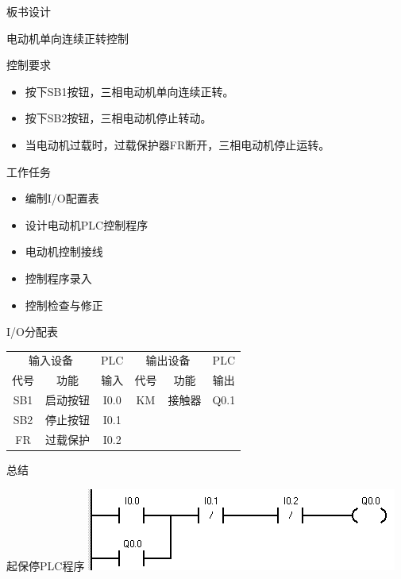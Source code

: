 {\begin{landscape}
\end{landscape}
\clearpage

\begin{center}
{\huge 板书设计}
\end{center}
}

\begin{frame}[containsverbatim]{电动机单向连续正转控制}
\begin{block}{控制要求}
\begin{itemize}
\item 按下SB1按钮，三相电动机单向连续正转。
\item 按下SB2按钮，三相电动机停止转动。
\item 当电动机过载时，过载保护器FR断开，三相电动机停止运转。
\end{itemize}
\end{block}
\end{frame}
\begin{frame}{}
\begin{block}{工作任务}
\begin{itemize}
\item 编制I/O配置表
\item 设计电动机PLC控制程序
\item 电动机控制接线
\item 控制程序录入
\item 控制检查与修正
\end{itemize}
\end{block}
\end{frame}
\begin{frame}
\begin{block}{I/O分配表}
\begin{small}
\begin{tabular}{|c|c|c|c|c|c|}
\hline 
\multicolumn{2}{|c|}{输入设备} & PLC &\multicolumn{2}{|c|}{输出设备} & PLC \\ 
\cline{1-2}\cline{4-5}
代号 & 功能 & 输入 & 代号 & 功能 & 输出 \\ 
\hline 
SB1 & 启动按钮 & I0.0 & KM & 接触器 & Q0.1 \\ 
\hline 
SB2 & 停止按钮 & I0.1 &  & &  \\ 
\hline 
FR & 过载保护 & I0.2 &  &  &  \\ 
\hline
\end{tabular} 
\end{small}
\end{block}
\end{frame}
\begin{frame}{总结}
\begin{block}{起保停PLC程序}
\includegraphics[scale=0.95]{qibaoting.png}
\end{block}
\end{frame}
\endinput